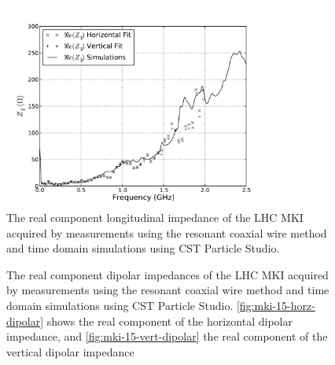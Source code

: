 \begin{figure}
\begin{center}
\includegraphics[width=0.8\textwidth]{LHC_MKI/figures/mki_15_sims_meas_long.pdf}
\end{center}
\caption{The real component longitudinal impedance of the LHC MKI acquired by measurements using the resonant coaxial wire method and time domain simulations using CST Particle Studio.}
\label{fig:mki-15-longitudinal}
\end{figure}

\begin{figure}
\caption{The real component dipolar impedances of the LHC MKI acquired by measurements using the resonant coaxial wire method and time domain simulations using CST Particle Studio. \ref{fig:mki-15-horz-dipolar} shows the real component of the horizontal dipolar impedance, and \ref{fig:mki-15-vert-dipolar} the real component of the vertical dipolar impedance}
\label{fig:mki-15-dipolar}
\end{figure}

